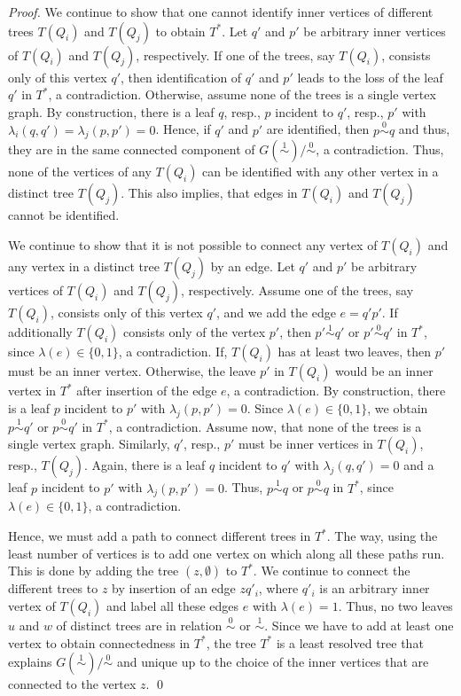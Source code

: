 \documentclass[smallextended]{svjour3}
\newcommand{\Ro}{\mathrel{\overset{0}{\sim}}}
\newcommand{\Rl}{\mathrel{\overset{1}{\sim}}}
\begin{document}
\begin{proof}
{  We continue to show that one cannot identify inner vertices of different
  trees $T(Q_i)$ and $T(Q_j)$ to obtain $T^*$.  Let $q'$ and $p'$ be
  arbitrary inner vertices of $T(Q_i)$ and $T(Q_j)$, respectively. If one
  of the trees, say $T(Q_i)$, consists only of this vertex $q'$, then
  identification of $q'$ and $p'$ leads to the loss of the leaf $q'$ in
  $T^*$, a contradiction.  Otherwise, assume none of the trees is a single
  vertex graph.  By construction, there is a leaf $q$, resp., $p$ incident
  to $q'$, resp., $p'$ with $\lambda_i(q,q')=\lambda_j(p,p')=0$.  Hence, if
  $q'$ and $p'$ are identified, then $p\Ro q$ and thus, they are in the
  same connected component of $G(\Rl)/\Ro$, a contradiction.  Thus, none of
  the vertices of any $T(Q_i)$ can be identified with any other vertex in a
  distinct tree $T(Q_j)$.  This also implies, that edges in $T(Q_i)$ and
  $T(Q_j)$ cannot be identified.

  We continue to show that it is not possible to connect any vertex of
  $T(Q_i)$ and any vertex in a distinct tree $T(Q_j)$ by an edge.  Let $q'$
  and $p'$ be arbitrary vertices of $T(Q_i)$ and $T(Q_j)$,
  respectively. Assume one of the trees, say $T(Q_i)$, consists only of
  this vertex $q'$, and we add the edge $e=q'p'$.  If additionally $T(Q_i)$
  consists only of the vertex $p'$, then $p'\Rl q'$ or $p'\Ro q'$ in $T^*$,
  since $\lambda(e)\in \{0,1\}$, a contradiction.  If, $T(Q_i)$ has at
  least two leaves, then $p'$ must be an inner vertex. Otherwise, the leave
  $p'$ in $T(Q_i)$ would be an inner vertex in $T^*$ after insertion of the
  edge $e$, a contradiction.  By construction, there is a leaf $p$
  incident to $p'$ with $\lambda_j(p,p')=0$. Since $\lambda(e)\in \{0,1\}$,
  we obtain $p\Rl q'$ or $p\Ro q'$ in $T^*$, a contradiction.  Assume now,
  that none of the trees is a single vertex graph.  Similarly, $q'$, resp.,
  $p'$ must be inner vertices in $T(Q_i)$, resp., $T(Q_j)$.  Again, there
  is a leaf $q$ incident to $q'$ with $\lambda_j(q,q')=0$ and a leaf $p$
  incident to $p'$ with $\lambda_j(p,p')=0$.  Thus, $p\Rl q$ or $p\Ro q$ in
  $T^*$, since $\lambda(e)\in \{0,1\}$, a contradiction.

  Hence, we must add a path to connect different trees in $T^*$.  The way,
  using the least number of vertices is to add one vertex on which along
  all these paths run. This is done by adding the tree $({z},\emptyset)$ to
  $T^*$.  We continue to connect the different trees to $z$ by insertion of
  an edge $zq'_i$, where $q'_i$ is an arbitrary inner vertex of $T(Q_i)$
  and label all these edges $e$ with $\lambda(e)=1$.  Thus, no two leaves
  $u$ and $w$ of distinct trees are in relation $\Ro$ or $\Rl$.  Since we
  have to add at least one vertex to obtain connectedness in $T^*$, the
  tree $T^*$ is a least resolved tree that explains $G(\Rl)/\Ro$ and unique
  up to the choice of the inner vertices that are connected to the vertex
  $z$.  \qed
}
\end{proof}
\end{document}
